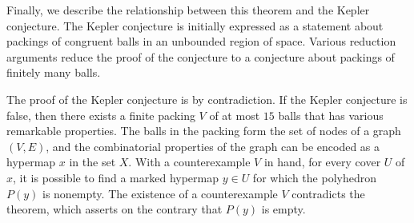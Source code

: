 \documentclass{llncs}
\begin{document}
Finally, we describe the relationship between this theorem and the
Kepler conjecture.  The Kepler conjecture is initially expressed as a
statement about packings of congruent balls in an unbounded region of
space.  Various reduction arguments reduce the proof of the conjecture
to a conjecture about packings of finitely many balls.  

The proof of the Kepler conjecture is by contradiction.
If the Kepler conjecture is false, then there exists a finite packing
$V$ of at most $15$ balls that has various remarkable properties.  The
balls in the packing form the set of nodes of a graph $(V,E)$, and the
combinatorial properties of the graph can be encoded as a hypermap $x$
in the set $X$.  With a counterexample $V$ in hand, for every cover $U$ of
$x$, it is possible to find a marked hypermap $y\in U$ for which the
polyhedron $P(y)$ is nonempty.  The existence of a
counterexample $V$ contradicts the theorem, which asserts on the contrary that
$P(y)$ is empty.

\raggedright

\end{document}
